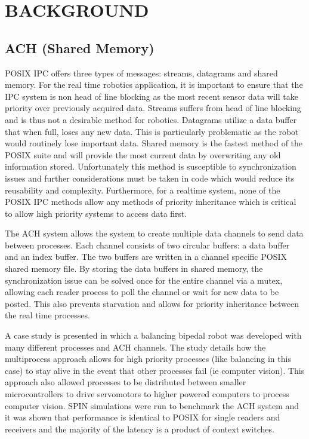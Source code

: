 \section{BACKGROUND}

\subsection{ACH (Shared Memory)}

POSIX IPC offers three types of messages: streams, datagrams and shared memory. For the real time robotics application, it is important to ensure that the IPC system is non head of line blocking as the most recent sensor data will take priority over previously acquired data. Streams suffers from head of line blocking and is thus not a desirable method for robotics. Datagrams utilize a data buffer that when full, loses any new data. This is particularly problematic as the robot would routinely lose important data. Shared memory is the fastest method of the POSIX suite and will provide the most current data by overwriting any old information stored. Unfortunately this method is susceptible to synchronization issues and further considerations must be taken in code which would reduce its reusability and complexity. Furthermore, for a realtime system, none of the POSIX IPC methods allow any methods of priority inheritance which is critical to allow high priority systems to access data first.

The ACH system allows the system to create multiple data channels to send data between processes. Each channel consists of two circular buffers: a data buffer and an index buffer. The two buffers are written in a channel specific POSIX shared memory file. By storing the data buffers in shared memory, the synchronization issue can be solved once for the entire channel via a mutex, allowing each reader process to poll the channel or wait for new data to be posted. This also prevents starvation and allows for priority inheritance between the real time processes.

A case study is presented \cite{REALTIMEACH} in which a balancing bipedal robot was developed with many different processes and ACH channels. The study details how the multiprocess approach allows for high priority processes (like balancing in this case) to stay alive in the event that other processes fail (ie computer vision). This approach also allowed processes to be distributed between smaller microcontrollers to drive servomotors to higher powered computers to process computer vision. SPIN simulations were run to benchmark the ACH system and it was shown that performance is identical to POSIX for single readers and receivers and the majority of the latency is a product of context switches. 



